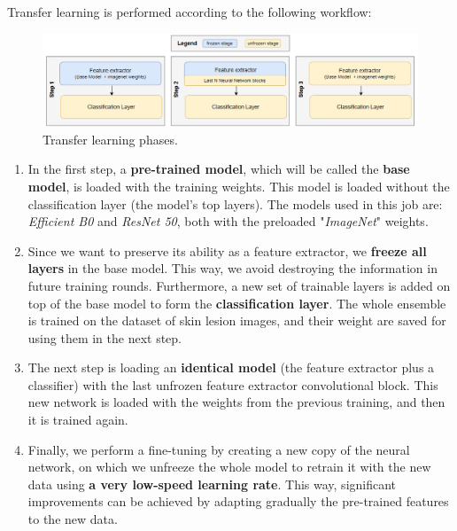 Transfer learning is performed according to the following workflow:

\begin{figure}[ht]
    \begin{center}
        \includegraphics[scale=0.80]{images/Building/Transfer learning/Transfer Learning phases.png}
        \caption{Transfer learning phases.}
    \label{fig: Transfer learning phases}    
    \end{center}
\end{figure}

\begin{enumerate}
    \label{ch:Transfer_learning}
    
    \item In the first step, a\textbf{ pre-trained model}, which will be called the \textbf{base model}, is loaded with the training weights. This model is loaded without the classification layer (the model's top layers). The models used in this job are: \textit{Efficient B0} and \textit{ResNet 50}, both with the preloaded "\textit{ImageNet}" weights. 
 
    \item Since we want to preserve its ability as a feature extractor, we \textbf{freeze all layers} in the base model.  This way, we avoid destroying the information in future training rounds. Furthermore, a new set of trainable layers is added on top of the base model to form the \textbf{classification layer}. The whole ensemble is trained on the dataset of skin lesion images, and their weight are saved for using them in the next step. 

    \item The next step is loading an \textbf{identical model} (the feature extractor plus a classifier) with the last unfrozen feature extractor convolutional block. This new network is loaded with the weights from the previous training, and then it is trained again.

    \item Finally, we perform a fine-tuning by creating a new copy of the neural network, on which we unfreeze the whole model to retrain it with the new data using \textbf{a very low-speed learning rate}. This way, significant improvements can be achieved by adapting gradually the pre-trained features to the new data.

\end{enumerate}

